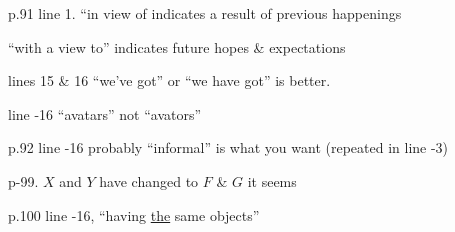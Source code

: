 
p.91 line 1. ``in view of indicates a result of previous happenings

``with a view to'' indicates future hopes \& expectations

lines 15 \& 16 ``we've got'' or ``we have got'' is better.

line -16 ``avatars'' not ``avators''

p.92 line -16 probably ``informal'' is what you want (repeated in line -3)

p-99. $X$ and $Y$ have changed to $F$ \& $G$ it seems

p.100 line -16, ``having \uline{the} same objects''


